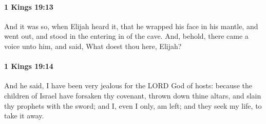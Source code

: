 		\paragraph{1 Kings 19:13} %
			\label{1KINGS-19-13}

			And it was so, when Elijah heard it, that he wrapped his face in his mantle, and went out, and stood in the entering in of the cave. And, behold, there came a voice unto him, and said, What doest thou here, Elijah?


		\paragraph{1 Kings 19:14} %
			\label{1KINGS-19-14}

			And he said, I have been very jealous for the LORD God of hosts: because the children of Israel have forsaken thy covenant, thrown down thine altars, and slain thy prophets with the sword; and I, even I only, am left; and they seek my life, to take it away.

